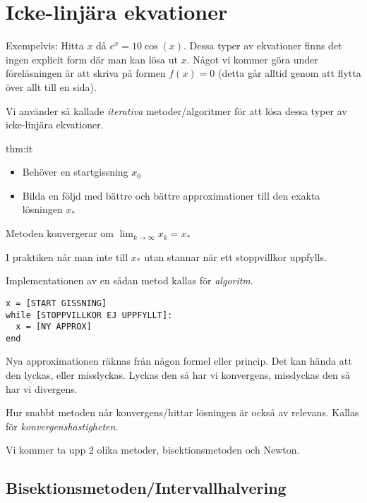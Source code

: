 \section{Icke-linjära ekvationer}
\noindent Exempelvis: Hitta $x$ då $e^x=10\cos(x)$. Dessa typer av ekvationer finns det ingen explicit form där man kan lösa ut $x$. Något vi kommer göra under föreläsningen är att skriva på formen $f(x) = 0$ (detta går alltid genom att flytta över allt till en sida).
\par\bigskip
\noindent Vi använder så kallade \textit{iterativa} metoder/algoritmer för att lösa dessa typer av icke-linjära ekvationer.
\par\bigskip

\begin{theo}{thm:it}
  \begin{itemize}
    \item Behöver en startgissning $x_0$
    \item Bilda en följd med bättre och bättre approximationer till den exakta lösningen $x_*$
  \end{itemize}
  \par\bigskip
  \noindent Metoden konvergerar om $\lim_{k\to\infty}x_k = x_*$
  \par\bigskip
  \noindent I praktiken når man inte till $x_*$ utan stannar när ett stoppvillkor uppfylls.
\end{theo}
\par\bigskip
\noindent Implementationen av en sådan metod kallas för \textit{algoritm}.

\begin{verbatim}
x = [START GISSNING]
while [STOPPVILLKOR EJ UPPFYLLT]:
  x = [NY APPROX]
end
\end{verbatim}
\par\bigskip
\noindent Nya approximationen räknas från någon formel eller princip. Det kan hända att den lyckas, eller misslyckas. Lyckas den så har vi konvergens, misslyckas den så har vi divergens.
\par\bigskip
\noindent Hur snabbt metoden når konvergens/hittar lösningen är också av relevans. Kallas för \textit{konvergenshastigheten}.
\par\bigskip
\noindent Vi kommer ta upp 2 olika metoder, bisektionsmetoden och Newton.

\subsection{Bisektionsmetoden/Intervallhalvering}\hfill\\

